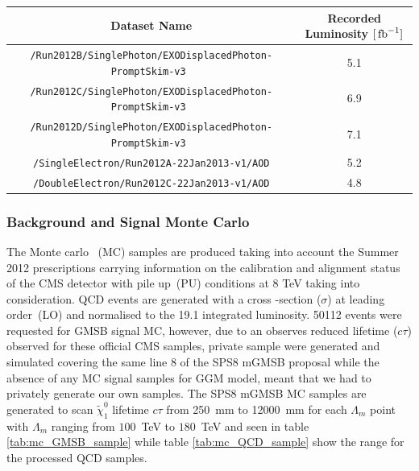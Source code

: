 \begin{center}
\centering
\begin{tabular}{c c}
\hline
Dataset Name & Recorded Luminosity $[\mbox{\ensuremath{\,\text{fb}^\text{$-$1}}}]$ \\
\hline
 \texttt{/Run2012B/SinglePhoton/EXODisplacedPhoton-PromptSkim-v3 } & 5.1 \\
 \texttt{/Run2012C/SinglePhoton/EXODisplacedPhoton-PromptSkim-v3 } & 6.9 \\
 \texttt{/Run2012D/SinglePhoton/EXODisplacedPhoton-PromptSkim-v3 } & 7.1 \\
\hline\hline
\texttt{/SingleElectron/Run2012A-22Jan2013-v1/AOD} & 5.2 \\
\texttt{/DoubleElectron/Run2012C-22Jan2013-v1/AOD} & 4.8 \\
\hline
\end{tabular}
\label{tab:DATA}
\end{center}


\subsubsection*{Background and Signal Monte Carlo}
The Monte carlo ~(MC) samples are produced taking into account the Summer 2012 prescriptions carrying information on the calibration and alignment status of the CMS detector with pile up~(PU) conditions at 8 TeV taking into consideration.
 QCD events are generated with a cross -section ($\sigma$) at leading order~(LO) and normalised to the 19.1 \fbinv integrated luminosity. 50112 events were requested for GMSB signal MC, however, due to an observes reduced lifetime ($c\tau$) observed for these official CMS samples, private sample were generated and simulated covering the same line 8 of the SPS8 mGMSB proposal  while the absence of any MC signal samples for GGM model, meant that we had to privately generate our own samples. The SPS8 mGMSB MC samples are generated to scan $\tilde{\chi}^{0}_{1}$ lifetime $c\tau$ from 250~mm to 12000~mm for each $\Lambda_{m}$ point with $\Lambda_{m}$ ranging from $100$~TeV to $180$~TeV and seen in table \ref{tab:mc_GMSB_sample} while  table \ref{tab:mc_QCD_sample} show the \pt range  for the processed QCD samples.

